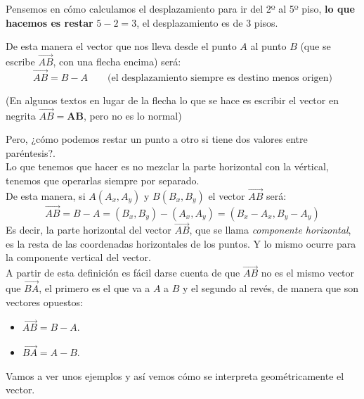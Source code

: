 \documentclass[a4paper,11pt,answers]{exam}
\begin{document}
Pensemos en cómo calculamos el desplazamiento para ir del 2º al 5º piso, \textbf{lo que hacemos es
  restar} $5-2 = 3$, el desplazamiento es de 3 pisos.

De esta manera el vector que nos lleva desde el punto $A$ al punto $B$ (que se escribe $\overrightarrow{AB}$, con una flecha encima) será:
\[\overrightarrow{AB} = B -A\quad\quad\text{(el desplazamiento siempre es destino menos origen)}\]
\begin{center}
  \small{(En algunos textos en lugar de la flecha lo que se hace es escribir el vector en
    negrita $\overrightarrow{AB} = \boldsymbol{AB}$, pero no es lo normal)}
\end{center}

Pero, ¿cómo podemos restar un punto a otro si tiene dos valores entre paréntesis?.\\
Lo que tenemos que hacer es no mezclar la parte horizontal con la vértical, tenemos que operarlas
siempre por separado.\\
De esta manera, si $A(A_x, A_y)$ y $B(B_x,B_y)$ el vector $\overrightarrow{AB}$ será:
\[\overrightarrow{AB} = B - A = (B_x,B_y) - (A_x,A_y) = (B_x - A_x, B_y - A_y)\]
Es decir, la parte horizontal del vector $\overrightarrow{AB}$, que se llama \textit{componente
  horizontal}, es la resta de las coordenadas horizontales de los puntos. Y lo mismo ocurre para la
componente vertical del vector.\\

A partir de esta definición es fácil darse cuenta de que $\overrightarrow{AB}$ no es el mismo vector
que $\overrightarrow{BA}$, el primero es el que va a $A$ a $B$ y el segundo al revés, de manera que
son vectores opuestos:
\begin{itemize}
\item $\overrightarrow{AB} = B-A$.
\item $\overrightarrow{BA} = A - B$.
\end{itemize}

Vamos a ver unos ejemplos y así vemos cómo se interpreta geométricamente el vector.
\end{document}
